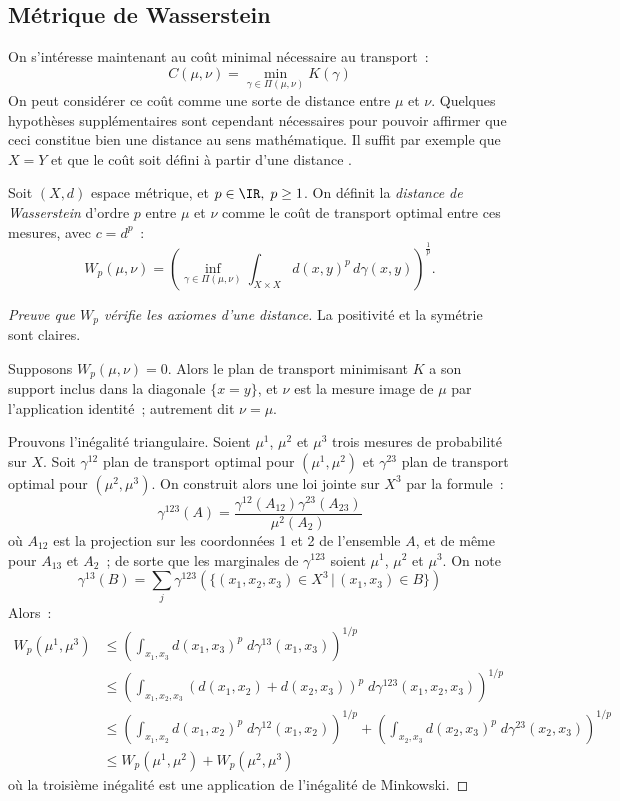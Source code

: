 \subsection{Métrique de Wasserstein}
On s'intéresse maintenant au coût minimal nécessaire au transport~:
\[C(\mu,\nu) = \min_{\gamma \in \Pi(\mu,\nu)} K(\gamma) \]
On peut considérer ce coût comme une sorte de distance entre $\mu$ et $\nu$. Quelques hypothèses supplémentaires sont cependant nécessaires pour pouvoir affirmer que ceci constitue bien une distance au sens mathématique. Il suffit par exemple que $X=Y$ et que le coût soit défini à partir d'une distance \cite{villani08}.

\begin{definition}
Soit $(X,d)$ espace métrique, et $p \in \IR,\;p \ge 1$. On définit la \emph{distance de Wasserstein} d'ordre $p$ entre $\mu$ et $\nu$ comme le coût de transport optimal entre ces mesures, avec $c = d^p$~:
\begin{equation}
\label{eq:wasserstein}
W_p(\mu,\nu) = \left(\inf_{\gamma \in \Pi(\mu,\nu)} \int_{X\times X} d(x,y)^p\,d\gamma(x,y) \right)^{\frac{1}{p}}.\end{equation}
\end{definition}

\begin{proof}[Preuve que $W_p$ vérifie les axiomes d'une distance]
La positivité et la symétrie sont claires.

Supposons $W_p(\mu,\nu) = 0$. Alors le plan de transport minimisant $K$ a son support inclus dans la diagonale $\{x=y\}$, et $\nu$ est la mesure image de $\mu$ par l'application identité~; autrement dit $\nu = \mu$.

Prouvons l'inégalité triangulaire. Soient $\mu^1$, $\mu^2$ et $\mu^3$ trois mesures de probabilité sur $X$. Soit $\gamma^{12}$ plan de transport optimal pour $(\mu^1,\mu^2)$ et $\gamma^{23}$ plan de transport optimal pour $(\mu^2,\mu^3)$. On construit alors une loi jointe sur $X^3$ par la formule~:
\[\gamma^{123}(A) = \frac{\gamma^{12}(A_{12}) \gamma^{23}(A_{23})}{\mu^2(A_2)}\]
où $A_{12}$ est la projection sur les coordonnées 1 et 2 de l'ensemble $A$, et de même pour $A_{13}$ et $A_{2}$~;
de sorte que les marginales de $\gamma^{123}$ soient $\mu^1$, $\mu^2$ et $\mu^3$. On note \[\gamma^{13}(B) = \sum_{j} \gamma^{123}(\{(x_1,x_2,x_3) \in X^3 \,|\, (x_1,x_3) \in B\})\] Alors~:
\[\begin{split}
W_p(\mu^1,\mu^3) & \le \left( \int_{x_1,x_3} d(x_1,x_3)^p \;d\gamma^{13}(x_1,x_3) \right)^{1/p} \\
&\le \left( \int_{x_1,x_2,x_3} (d(x_1,x_2) + d(x_2,x_3))^p \;d\gamma^{123}(x_1,x_2,x_3) \right)^{1/p} \\
& \le \left( \int_{x_1,x_2} d(x_1,x_2)^p \;d\gamma^{12}(x_1,x_2) \right)^{1/p} + \left( \int_{x_2,x_3} d(x_2,x_3)^p \;d\gamma^{23}(x_2,x_3) \right)^{1/p} \\
& \le W_p(\mu^1,\mu^2) + W_p(\mu^2,\mu^3)
\end{split}\]
où la troisième inégalité est une application de l'inégalité de Minkowski.
\end{proof}


